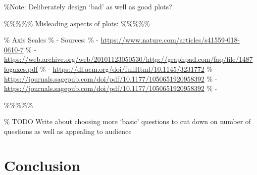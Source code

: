 \documentclass[
  12pt,
  twocolumn]{book}
\begin{document}
\%Note: Deliberately design `bad' as well as good plots?

\%\%\%\%\% Misleading aspects of plots: \%\%\%\%\%

\% Axis Scales \% - Sources: \% -
\url{https://www.nature.com/articles/s41559-018-0610-7} \% -
\url{https://web.archive.org/web/20101123050530/http://graphpad.com/faq/file/1487logaxes.pdf}
\% - \url{https://dl.acm.org/doi/fullHtml/10.1145/3231772} \% -
\url{https://journals.sagepub.com/doi/pdf/10.1177/1050651920958392} \% -
\url{https://journals.sagepub.com/doi/pdf/10.1177/1050651920958392} \% -

\%\%\%\%\%

\% TODO Write about choosing more `basic' questions to cut down on
number of questions as well as appealing to audience

\section{Conclusion}

\backmatter
  
\end{document}
